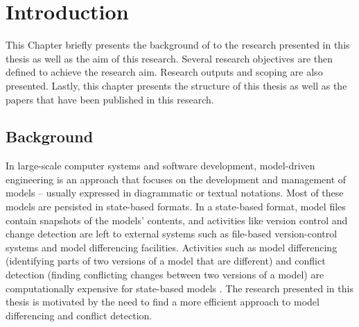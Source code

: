 \chapter{Introduction}
\label{ch:introduction}
This Chapter briefly presents the background of to the research presented in this thesis as well as the aim of this research. Several research objectives are then defined to achieve the research aim. Research outputs and scoping are also presented. Lastly, this chapter presents the structure of this thesis as well as the papers that have been published in this research.

\section{Background}
\label{sec:background}
In large-scale computer systems and software development, model-driven engineering is an approach that focuses on the development and management of models -- usually expressed in diagrammatic or textual notations. Most of these models are persisted in state-based formats. In a state-based format, model files contain snapshots of the models' contents, and activities like version control and change detection are left to external systems such as file-based version-control systems and model differencing facilities. Activities such as model differencing (identifying parts of two versions of a model that are different) and conflict detection (finding conflicting changes between two versions of a model) are computationally expensive for state-based models \cite{Kolovos:2009:DMM:1564596.1564641}. The research presented in this thesis is motivated by the need to find a more efficient approach to model differencing and conflict detection.

